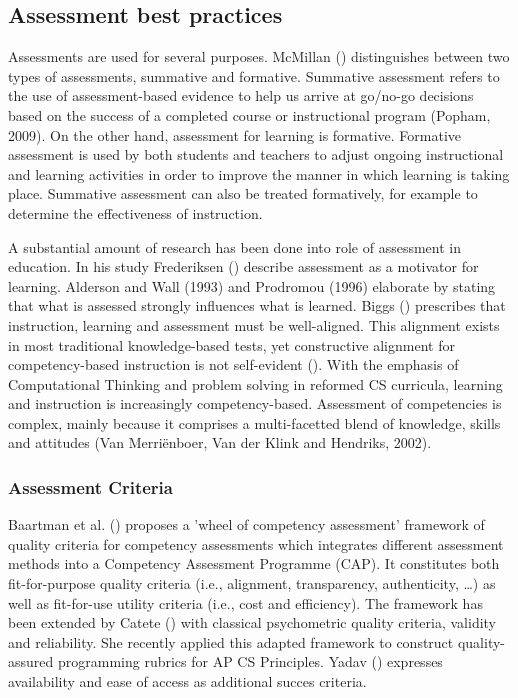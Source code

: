 \subsection{Assessment best practices}


Assessments are used for several purposes. McMillan (\cite{mcmillan2007formative}) distinguishes between two types of assessments, summative and formative. Summative assessment refers to the use of assessment-based evidence to help us arrive at go/no-go decisions based on the success of a completed course or instructional program (Popham, 2009). On the other hand, assessment for learning is formative. Formative assessment is used by both students and teachers to adjust ongoing instructional and learning activities in order to improve the manner in which learning is taking place. Summative assessment can also be treated formatively, for example to determine the effectiveness of instruction.




A substantial amount of research has been done into role of assessment in education. In his study Frederiksen (\cite{frederiksen1984}) describe assessment as a motivator for learning. Alderson and Wall (1993) and Prodromou (1996) elaborate by stating that what is assessed strongly influences what is learned. Biggs (\cite{biggs1996}) prescribes that instruction, learning and assessment must be well-aligned. This alignment exists in most traditional knowledge-based tests, yet constructive alignment for competency-based instruction is not self-evident (\cite{baartman2006wheel}). With the emphasis of Computational Thinking and problem solving in reformed CS curricula, learning and instruction is increasingly competency-based. Assessment of competencies is complex, mainly because it comprises a multi-facetted blend of knowledge, skills and attitudes (Van Merriënboer, Van der Klink and Hendriks, 2002).

\subsubsection*{Assessment Criteria}\label{sec:qualityCriteria}
Baartman et al. (\cite{baartman2006wheel}) proposes a 'wheel of competency assessment' framework of quality criteria for competency assessments which integrates different assessment methods into a Competency Assessment Programme (CAP). It constitutes both fit-for-purpose quality criteria (i.e., alignment, transparency, authenticity, \ldots) as well as fit-for-use utility criteria (i.e., cost and efficiency). The framework has been extended by Catete (\cite{catete2017framework}) with classical psychometric quality criteria, validity and reliability. She recently applied this adapted framework to construct quality-assured programming rubrics for AP CS Principles. Yadav (\cite{Yadav2015}) expresses availability and ease of access as additional succes criteria.





